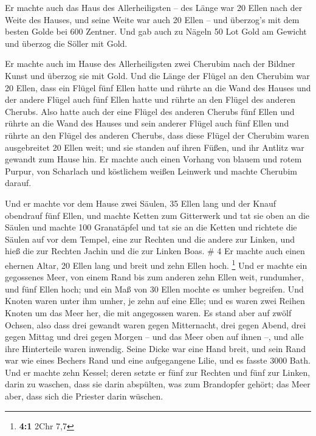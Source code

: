  Er machte auch das Haus des Allerheiligsten -- des Länge
war 20 Ellen nach der Weite des Hauses, und seine Weite war auch 20
Ellen -- und überzog's mit dem besten Golde bei 600 Zentner.
 Und gab auch zu Nägeln 50 Lot Gold am Gewicht und überzog
die Söller mit Gold.

 Er machte auch im Hause des Allerheiligsten zwei
Cherubim nach der Bildner Kunst und überzog sie mit Gold.
 Und die Länge der Flügel an den Cherubim war 20 Ellen,
dass ein Flügel fünf Ellen hatte und rührte an die Wand des Hauses und
der andere Flügel auch fünf Ellen hatte und rührte an den Flügel des
anderen Cherubs.  Also hatte auch der eine Flügel des
anderen Cherubs fünf Ellen und rührte an die Wand des Hauses und sein
anderer Flügel auch fünf Ellen und rührte an den Flügel des anderen
Cherubs,  dass diese Flügel der Cherubim waren
ausgebreitet 20 Ellen weit; und sie standen auf ihren Füßen, und ihr
Antlitz war gewandt zum Hause hin.  Er machte auch einen
Vorhang von blauem und rotem Purpur, von Scharlach und köstlichem weißen
Leinwerk und machte Cherubim darauf.

 Und er machte vor dem Hause zwei Säulen, 35 Ellen lang
und der Knauf obendrauf fünf Ellen,  und machte Ketten
zum Gitterwerk und tat sie oben an die Säulen und machte 100 Granatäpfel
und tat sie an die Ketten  und richtete die Säulen auf
vor dem Tempel, eine zur Rechten und die andere zur Linken, und hieß die
zur Rechten Jachin und die zur Linken Boas. \# 4  Er
machte auch einen ehernen Altar, 20 Ellen lang und breit und zehn Ellen
hoch. \footnote{\textbf{4:1} 2Chr 7,7}  Und er machte ein
gegossenes Meer, von einem Rand bis zum anderen zehn Ellen weit,
rundumher, und fünf Ellen hoch; und ein Maß von 30 Ellen mochte es umher
begreifen.  Und Knoten waren unter ihm umher, je zehn auf
eine Elle; und es waren zwei Reihen Knoten um das Meer her, die mit
angegossen waren.  Es stand aber auf zwölf Ochsen, also
dass drei gewandt waren gegen Mitternacht, drei gegen Abend, drei gegen
Mittag und drei gegen Morgen -- und das Meer oben auf ihnen --, und alle
ihre Hinterteile waren inwendig.  Seine Dicke war eine
Hand breit, und sein Rand war wie eines Bechers Rand und eine
aufgegangene Lilie, und es fasste 3000 Bath.  Und er
machte zehn Kessel; deren setzte er fünf zur Rechten und fünf zur
Linken, darin zu waschen, dass sie darin abspülten, was zum Brandopfer
gehört; das Meer aber, dass sich die Priester darin wüschen.

